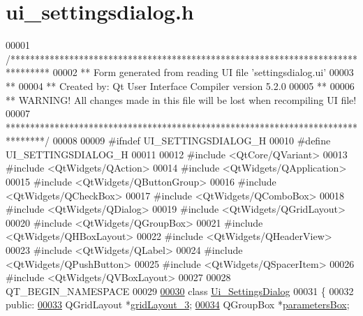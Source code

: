 \hypertarget{a00141_source}{\section{ui\+\_\+settingsdialog.\+h}
\label{a00141_source}
}

\begin{DoxyCode}
00001 \textcolor{comment}{/********************************************************************************}
00002 \textcolor{comment}{** Form generated from reading UI file 'settingsdialog.ui'}
00003 \textcolor{comment}{**}
00004 \textcolor{comment}{** Created by: Qt User Interface Compiler version 5.2.0}
00005 \textcolor{comment}{**}
00006 \textcolor{comment}{** WARNING! All changes made in this file will be lost when recompiling UI file!}
00007 \textcolor{comment}{********************************************************************************/}
00008 
00009 \textcolor{preprocessor}{#ifndef UI\_SETTINGSDIALOG\_H}
00010 \textcolor{preprocessor}{#define UI\_SETTINGSDIALOG\_H}
00011 
00012 \textcolor{preprocessor}{#include <QtCore/QVariant>}
00013 \textcolor{preprocessor}{#include <QtWidgets/QAction>}
00014 \textcolor{preprocessor}{#include <QtWidgets/QApplication>}
00015 \textcolor{preprocessor}{#include <QtWidgets/QButtonGroup>}
00016 \textcolor{preprocessor}{#include <QtWidgets/QCheckBox>}
00017 \textcolor{preprocessor}{#include <QtWidgets/QComboBox>}
00018 \textcolor{preprocessor}{#include <QtWidgets/QDialog>}
00019 \textcolor{preprocessor}{#include <QtWidgets/QGridLayout>}
00020 \textcolor{preprocessor}{#include <QtWidgets/QGroupBox>}
00021 \textcolor{preprocessor}{#include <QtWidgets/QHBoxLayout>}
00022 \textcolor{preprocessor}{#include <QtWidgets/QHeaderView>}
00023 \textcolor{preprocessor}{#include <QtWidgets/QLabel>}
00024 \textcolor{preprocessor}{#include <QtWidgets/QPushButton>}
00025 \textcolor{preprocessor}{#include <QtWidgets/QSpacerItem>}
00026 \textcolor{preprocessor}{#include <QtWidgets/QVBoxLayout>}
00027 
00028 QT\_BEGIN\_NAMESPACE
00029 
\hypertarget{a00141_source_l00030}{}\hyperlink{a00082}{00030} \textcolor{keyword}{class }\hyperlink{a00082}{Ui\_SettingsDialog}
00031 \{
00032 \textcolor{keyword}{public}:
\hypertarget{a00141_source_l00033}{}\hyperlink{a00082_a2cc53955b73f22f0cfcf508da4654b16}{00033}     QGridLayout *\hyperlink{a00082_a2cc53955b73f22f0cfcf508da4654b16}{gridLayout\_3};
\hypertarget{a00141_source_l00034}{}\hyperlink{a00082_a47cebbe70a990bd1f309250101022889}{00034}     QGroupBox *\hyperlink{a00082_a47cebbe70a990bd1f309250101022889}{parametersBox};

\end{DoxyCode}
